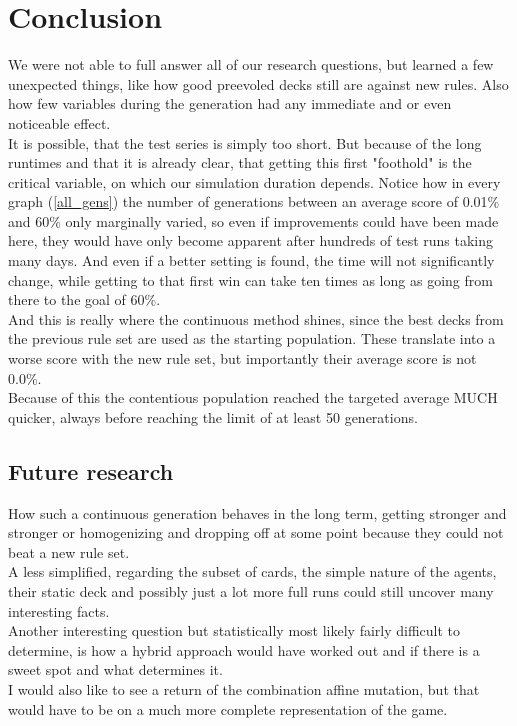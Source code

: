 \chapter{Conclusion}
\label{ch:conclusion}
We were not able to full answer all of our research questions, but learned a few unexpected things, like how good preevoled decks still are against new rules. Also how few variables during the generation had any immediate and or even noticeable effect.\\
It is possible, that the test series is simply too short. But because of the long runtimes and that it is already clear, that getting this first "foothold" is the critical variable, on which our simulation duration depends. Notice how in every graph (\ref{all_gens}) the number of generations between an average score of 0.01\% and 60\% only marginally varied, so even if improvements could have been made here, they would have only become apparent after hundreds of test runs taking many days. And even if a better setting is found, the time will not significantly change, while getting to that first win can take ten times as long as going from there to the goal of 60\%. \\
And this is really where the continuous method shines, since the best decks from the previous rule set are used as the starting population. These translate into a worse score with the new rule set, but importantly their average score is not 0.0\%. \\
Because of this the contentious population reached the targeted average MUCH quicker, always before reaching the limit of at least 50 generations.\\

\section{Future research}
How such a continuous generation behaves in the long term, getting stronger and stronger or homogenizing and dropping off at some point because they could not beat a new rule set. \\
A less simplified, regarding the subset of cards, the simple nature of the agents, their static deck and possibly just a lot more full runs could still uncover many interesting facts.\\
Another interesting question but statistically most likely fairly difficult to determine, is how a hybrid approach would have worked out and if there is a sweet spot and what determines it.\\
I would also like to see a return of the combination affine mutation, but that would have to be on a much more complete representation of the game.\\